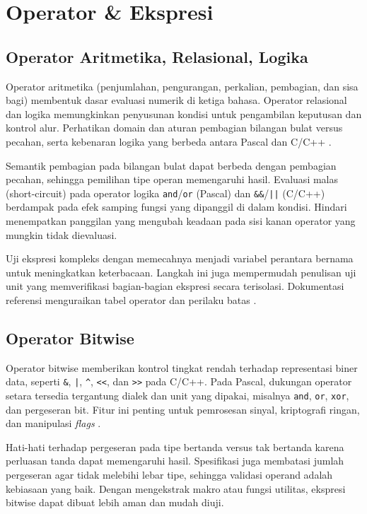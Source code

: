 \documentclass[../main.tex]{subfiles}
\begin{document}
\chapter{Operator \& Ekspresi}
\section{Operator Aritmetika, Relasional, Logika}
Operator aritmetika (penjumlahan, pengurangan, perkalian, pembagian, dan sisa bagi) membentuk dasar evaluasi numerik di ketiga bahasa. Operator relasional dan logika memungkinkan penyusunan kondisi untuk pengambilan keputusan dan kontrol alur. Perhatikan domain dan aturan pembagian bilangan bulat versus pecahan, serta kebenaran logika yang berbeda antara Pascal dan C/C++ \parencite{pascal-tutorial-wikibooks,gnu-c-manual,cpp-reference}.

Semantik pembagian pada bilangan bulat dapat berbeda dengan pembagian pecahan, sehingga pemilihan tipe operan memengaruhi hasil. Evaluasi malas (short-circuit) pada operator logika \texttt{and}/\texttt{or} (Pascal) dan \texttt{&&}/\texttt{||} (C/C++) berdampak pada efek samping fungsi yang dipanggil di dalam kondisi. Hindari menempatkan panggilan yang mengubah keadaan pada sisi kanan operator yang mungkin tidak dievaluasi.

Uji ekspresi kompleks dengan memecahnya menjadi variabel perantara bernama untuk meningkatkan keterbacaan. Langkah ini juga mempermudah penulisan uji unit yang memverifikasi bagian-bagian ekspresi secara terisolasi. Dokumentasi referensi menguraikan tabel operator dan perilaku batas \parencite{pascal-tutorial-wikibooks,gnu-c-manual,cpp-reference}.

\section{Operator Bitwise}
Operator bitwise memberikan kontrol tingkat rendah terhadap representasi biner data, seperti \texttt{\&}, \texttt{|}, \texttt{\^{}}, \texttt{<<}, dan \texttt{>>} pada C/C++. Pada Pascal, dukungan operator setara tersedia tergantung dialek dan unit yang dipakai, misalnya \texttt{and}, \texttt{or}, \texttt{xor}, dan pergeseran bit. Fitur ini penting untuk pemrosesan sinyal, kriptografi ringan, dan manipulasi \emph{flags} \parencite{free-pascal-docs,iso-c-draft-n1570,cpp-reference}.

Hati-hati terhadap pergeseran pada tipe bertanda versus tak bertanda karena perluasan tanda dapat memengaruhi hasil. Spesifikasi juga membatasi jumlah pergeseran agar tidak melebihi lebar tipe, sehingga validasi operand adalah kebiasaan yang baik. Dengan mengekstrak makro atau fungsi utilitas, ekspresi bitwise dapat dibuat lebih aman dan mudah diuji.
\end{document}
